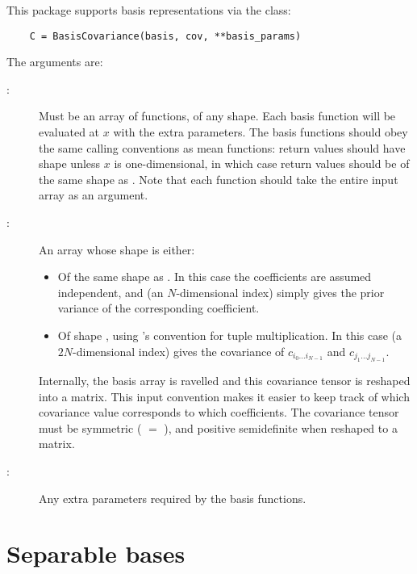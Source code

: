\documentclass[article]{jss}
\begin{document}
This package supports basis representations via the  class:
\begin{verbatim}
    C = BasisCovariance(basis, cov, **basis_params)
\end{verbatim}
The arguments are:
\begin{description}
    \item[:] Must be an array of functions, of any shape. Each basis function will be evaluated at $x$ with the extra parameters. The basis functions should obey the same calling conventions as mean functions: return values should have shape  unless $x$ is one-dimensional, in which case return values should be of the same shape as . Note that each function should take the entire input array as an argument.
    \item[:] An array whose shape is either:
        \begin{itemize}
            \item Of the same shape as . In this case the coefficients are assumed independent, and  (an $N$-dimensional index) simply gives the prior variance of the corresponding coefficient.
            \item Of shape , using 's convention for tuple multiplication. In this case  (a $2N$-dimensional index) gives the covariance of $c_{i_0\ldots i_{N-1}}$ and $c_{j_1\ldots j_{N-1}}$.
        \end{itemize}
        Internally, the basis array is ravelled and this covariance tensor is reshaped into a matrix. This input convention makes it easier to keep track of which covariance value corresponds to which coefficients. The covariance tensor must be symmetric ( $=$ ), and positive semidefinite when reshaped to a matrix.
    \item[:] Any extra parameters required by the basis functions.
\end{description}

\section{Separable bases}
\end{document}
